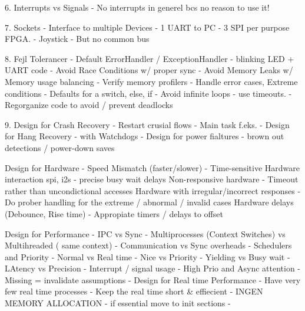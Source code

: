 \documentclass[11pt]{article}
\begin{document}
6. Interrupts vs Signals
    - No interrupts in generel bcs no reason to use it!

7. Sockets
- Interface to multiple Devices
    - 1 UART to PC
    - 3 SPI per purpose FPGA.
    - Joystick
        - But no common bus

8. Fejl Tolerancer 
- Default ErrorHandler / ExceptionHandler 
    - blinking LED + UART code
- Avoid Race Conditions w/ proper sync
- Avoid Memory Leaks w/ Memory usage balancing - Verify memory profilers
- Handle error cases, Extreme conditions
    - Defaults for a switch, else, if
- Avoid infinite  loops - use timeouts.
- Regorganize code to avoid / prevent deadlocks

9. Design for Crash Recovery
- Restart crusial flows - Main task f.eks.
- Design for Hang Recovery - with Watchdogs
- Design for power fialtures - brown out detections / power-down saves

Design for Hardware
- Speed Mismatch (faster/slower)
- Time-sensitive Hardware interaction spi, i2s - precise busy wait delays
Non-responsive hardware
- Timeout rather than uncondictional accesses
 Hardware with irregular/incorrect responses
- Do prober handling for the extreme / abnormal / invalid cases
Hardware delays (Debounce, Rise time)
- Appropiate timers / delays to offset

Design for Performance
- IPC vs Sync
    - Multiprocesses (Context Switches) vs Multihreaded ( same context)
    - Communication vs Sync overheads
- Schedulers and Priority
    - Normal vs Real time
    - Nice vs Priority
- Yielding vs Busy wait
    - LAtency vs Precision
- Interrupt / signal usage
    - High Prio and Async attention
    - Missing = invalidate assumptions
- Design for Real time Performance
- Have very few real time processes
- Keep the real time short \& effiecient
    - INGEN MEMORY ALLOCATION
    - if essential move to init sections
- 




\printbibliography
\end{document}
